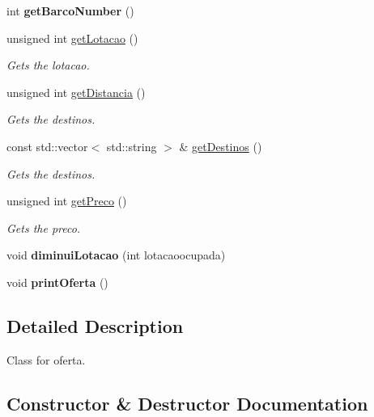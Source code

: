 \begin{DoxyCompactItemize}
\mbox{\label{classOferta_abf0f062fa730edf6d4232926980b106c}} 
int {\bfseries get\+Barco\+Number} ()
\item 
unsigned int \hyperlink{classOferta_a9c8fbec401e54e590828209931bf25b0}{get\+Lotacao} ()
\begin{DoxyCompactList}\small\item\em Gets the lotacao. \end{DoxyCompactList}\item 
unsigned int \hyperlink{classOferta_a0d07f80f25f4fb21c0819c3e25d67fb9}{get\+Distancia} ()
\begin{DoxyCompactList}\small\item\em Gets the destinos. \end{DoxyCompactList}\item 
const std\+::vector$<$ std\+::string $>$ \& \hyperlink{classOferta_a746c91e5db19098d211a3f6bde2ec8ec}{get\+Destinos} ()
\begin{DoxyCompactList}\small\item\em Gets the destinos. \end{DoxyCompactList}\item 
unsigned int \hyperlink{classOferta_a6237afc2e8a33fb55b1ef0decf9d9aaa}{get\+Preco} ()
\begin{DoxyCompactList}\small\item\em Gets the preco. \end{DoxyCompactList}\item 
\mbox{\label{classOferta_a15e6c1e4f49243136eb5ca1d46925a77}} 
void {\bfseries diminui\+Lotacao} (int lotacaoocupada)
\item 
\mbox{\label{classOferta_a745e9845f3d1a36e8a8712d576f303ba}} 
void {\bfseries print\+Oferta} ()
\end{DoxyCompactItemize}


\subsection{Detailed Description}
Class for oferta. 

\subsection{Constructor \& Destructor Documentation}
\mbox{\label{classOferta_a49a53f9d6ba51f97a3b428c8fac98d7f}} 
